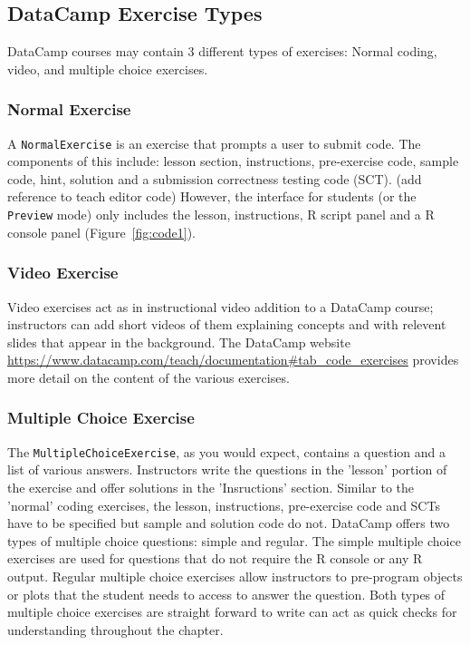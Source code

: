 \documentclass[12pt]{article}\usepackage[]{graphicx}\usepackage[]{color}
\begin{document}
\subsection{DataCamp Exercise Types}
DataCamp courses may contain 3 different types of exercises: Normal coding, video, and multiple choice exercises.
\subsubsection{Normal Exercise}
A \texttt{NormalExercise} is an exercise that prompts a user to submit code. The components of this include: lesson section, instructions, pre-exercise code, sample code, hint, solution and a submission correctness testing code (SCT). (add reference to teach editor code) However, the interface for students (or the \texttt{Preview}
mode) only includes the lesson, instructions, R script panel and a R console panel (Figure~\ref{fig:code1}).
\subsubsection{Video Exercise}
Video exercises act as in instructional video addition to a DataCamp course; instructors can add short videos of them explaining concepts and with 
relevent slides that appear in the background. The DataCamp website \url{https://www.datacamp.com/teach/documentation#tab_code_exercises} provides 
more detail on the content of the various exercises. 

\subsubsection{Multiple Choice Exercise}

The \texttt{MultipleChoiceExercise}, as you would expect, contains a question and a list of various answers. Instructors write the questions in the 'lesson'
portion of the exercise and offer solutions in the 'Insructions' section. Similar to the 'normal' coding exercises, the lesson, instructions, pre-exercise 
code and SCTs have to be specified but sample and solution code do not. DataCamp offers two types of multiple choice questions: simple and regular. 
The simple multiple choice exercises are used for questions that do not require the R console or any R output. Regular multiple choice exercises 
allow instructors to pre-program objects or plots that the student needs to access to answer the question. Both types of multiple choice exercises 
are straight forward to write can act as quick checks for understanding throughout the chapter.
\end{document}
